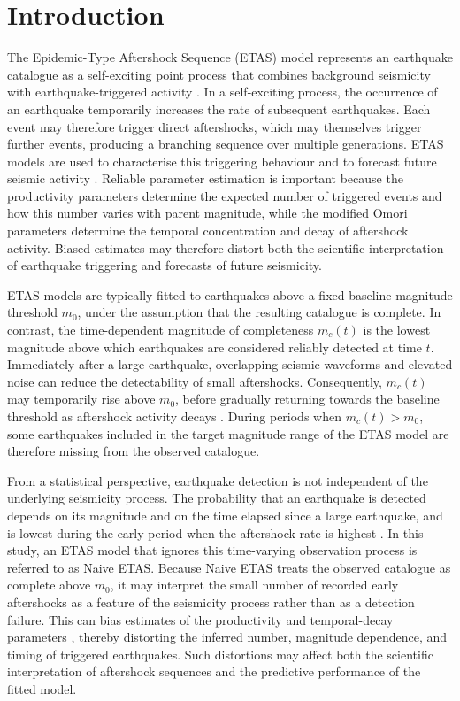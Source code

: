 \documentclass{statsmsc}
\begin{document}
\section{Introduction}

The Epidemic-Type Aftershock Sequence (ETAS) model represents an earthquake catalogue as a self-exciting point process that combines background seismicity with earthquake-triggered activity \citep{ogata1988}. In a self-exciting process, the occurrence of an earthquake temporarily increases the rate of subsequent earthquakes. Each event may therefore trigger direct aftershocks, which may themselves trigger further events, producing a branching sequence over multiple generations. ETAS models are used to characterise this triggering behaviour and to forecast future seismic activity \citep{mizrahi2021}. Reliable parameter estimation is important because the productivity parameters determine the expected number of triggered events and how this number varies with parent magnitude, while the modified Omori parameters determine the temporal concentration and decay of aftershock activity. Biased estimates may therefore distort both the scientific interpretation of earthquake triggering and forecasts of future seismicity.

ETAS models are typically fitted to earthquakes above a fixed baseline
magnitude threshold \(m_0\), under the assumption that the resulting catalogue
is complete. In contrast, the time-dependent magnitude of completeness
\(m_c(t)\) is the lowest magnitude above which earthquakes are considered
reliably detected at time \(t\). Immediately after a large earthquake,
overlapping seismic waveforms and elevated noise can reduce the detectability
of small aftershocks. Consequently, \(m_c(t)\) may temporarily rise above
\(m_0\), before gradually returning towards the baseline threshold as
aftershock activity decays \citep{omi2014,hainzl2016}. During periods when
\(m_c(t)>m_0\), some earthquakes included in the target magnitude range of the
ETAS model are therefore missing from the observed catalogue.

From a statistical perspective, earthquake detection is not independent of
the underlying seismicity process. The probability that an earthquake is
detected depends on its magnitude and on the time elapsed since a large
earthquake, and is lowest during the early period when the aftershock rate is
highest \citep{omi2014,hainzl2016}. In this study, an ETAS model that ignores
this time-varying observation process is referred to as Naive ETAS. Because
Naive ETAS treats the observed catalogue as complete above \(m_0\), it may
interpret the small number of recorded early aftershocks as a feature of the
seismicity process rather than as a detection failure. This can bias estimates
of the productivity and temporal-decay parameters
\citep{seif2017,naylor2023}, thereby distorting the inferred number, magnitude
dependence, and timing of triggered earthquakes. Such distortions may affect
both the scientific interpretation of aftershock sequences and the predictive
performance of the fitted model.
\end{document}
